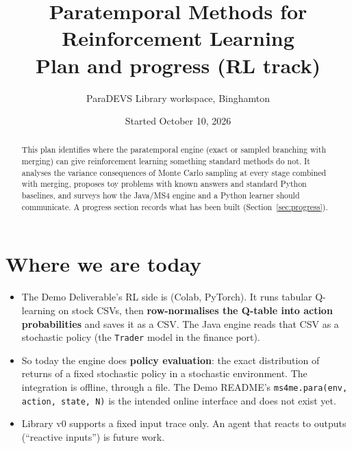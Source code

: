\documentclass[11pt]{article}
\title{\textbf{Paratemporal Methods for Reinforcement Learning}\\[4pt]\large Plan and progress (RL track)}
\author{ParaDEVS Library workspace, Binghamton}
\date{Started October 10, 2026}
\newcommand{\code}[1]{\texttt{#1}}
\begin{document}
\maketitle

\begin{abstract}
\noindent This plan identifies where the paratemporal engine (exact or sampled branching with merging) can give
reinforcement learning something standard methods do not. It analyses the variance consequences of Monte Carlo
sampling at every stage combined with merging, proposes toy problems with known answers and standard Python baselines,
and surveys how the Java/MS4 engine and a Python learner should communicate. A progress section records what has been
built (Section~\ref{sec:progress}).
\end{abstract}

\relateddocs

\tableofcontents

\section{Where we are today}
\begin{itemize}
\item The Demo Deliverable's RL side is  (Colab, PyTorch). It runs tabular
  Q-learning on stock CSVs, then \textbf{row-normalises the Q-table into action probabilities} and saves it as a CSV.
  The Java engine reads that CSV as a stochastic policy (the \code{Trader} model in the finance port).
\item So today the engine does \textbf{policy evaluation}: the exact distribution of returns of a fixed stochastic
  policy in a stochastic environment. The integration is offline, through a file. The Demo README's
  \code{ms4me.para(env, action, state, N)} is the intended online interface and does not exist yet.
\item Library v0 supports a fixed input trace only. An agent that reacts to outputs (``reactive inputs'') is future work.
\end{itemize}

\end{document}
